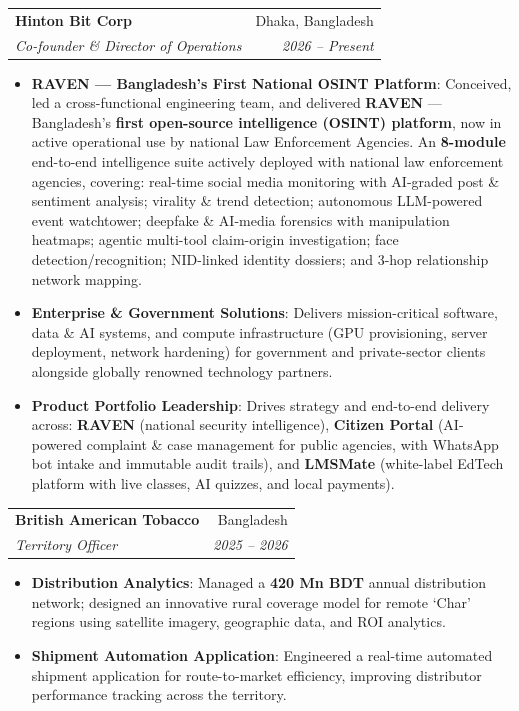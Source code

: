 \documentclass[a4paper,10pt]{article}
\makeatletter
\newcommand{\resumeItem}[2]{
  \item\small{
    \textbf{#1}{: #2 \vspace{-2pt}}
  }
}
\newcommand{\resumeSubheading}[4]{
  \vspace{-1pt}\item
    \begin{tabular*}{0.97\textwidth}{l@{\extracolsep{\fill}}r}
      \textbf{#1} & \small #2 \\
      \textit{\small #3} & \textit{\small #4} \\
    \end{tabular*}\vspace{-5pt}
}
\newcommand{\resumeItemListStart}{\begin{itemize}}
\newcommand{\resumeItemListEnd}{\end{itemize}\vspace{-5pt}}
\makeatother
\begin{document}
    \resumeSubheading{Hinton Bit Corp}{Dhaka, Bangladesh}
    {Co-founder \& Director of Operations}{2026 -- Present}
    \resumeItemListStart
      \resumeItem{RAVEN --- Bangladesh's First National OSINT Platform}
        {Conceived, led a cross-functional engineering team, and delivered \textbf{RAVEN} ---
         Bangladesh's \textbf{first open-source intelligence (OSINT) platform}, now in active
         operational use by national Law Enforcement Agencies. An \textbf{8-module} end-to-end
         intelligence suite actively deployed with national law enforcement agencies, covering: real-time social media monitoring
         with AI-graded post \& sentiment analysis; virality \& trend detection; autonomous
         LLM-powered event watchtower; deepfake \& AI-media forensics with manipulation
         heatmaps; agentic multi-tool claim-origin investigation; face detection/recognition;
         NID-linked identity dossiers; and 3-hop relationship network mapping.}
      \resumeItem{Enterprise \& Government Solutions}
        {Delivers mission-critical software, data \& AI systems, and compute infrastructure
         (GPU provisioning, server deployment, network hardening) for government and
         private-sector clients alongside globally renowned technology partners.}
      \resumeItem{Product Portfolio Leadership}
        {Drives strategy and end-to-end delivery across: \textbf{RAVEN} (national security
         intelligence), \textbf{Citizen Portal} (AI-powered complaint \& case management for
         public agencies, with WhatsApp bot intake and immutable audit trails), and
         \textbf{LMSMate} (white-label EdTech platform with live classes, AI quizzes, and
         local payments).}
    \resumeItemListEnd

    \vspace{-5pt}

    \resumeSubheading{British American Tobacco}{Bangladesh}
    {Territory Officer}{2025 -- 2026}
    \resumeItemListStart
      \resumeItem{Distribution Analytics}
        {Managed a \textbf{420 Mn BDT} annual distribution network; designed an innovative
         rural coverage model for remote `Char' regions using satellite imagery, geographic
         data, and ROI analytics.}
      \resumeItem{Shipment Automation Application}
        {Engineered a real-time automated shipment application for route-to-market
         efficiency, improving distributor performance tracking across the territory.}
    \resumeItemListEnd
\end{document}
